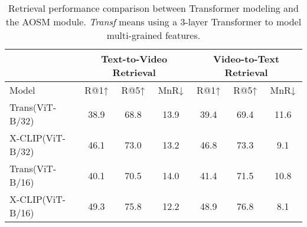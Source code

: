 \documentclass[sigconf]{acmart}
\begin{document}
\begin{table*}[]
\caption{Retrieval performance comparison between Transformer modeling and the AOSM module. \emph{Transf} means using a 3-layer Transformer to model multi-grained features.}
\begin{tabular}{l|ccc|ccc} 
\hline
                    & \multicolumn{3}{c}{Text-to-Video Retrieval} & \multicolumn{3}{c}{Video-to-Text Retrieval}               \\ \hline
Model               & R@1↑          & R@5↑                 & MnR↓          & R@1↑          & R@5↑                   & MnR↓    \\ \hline
Trans(ViT-B/32)     & 38.9         & 68.8        & 13.9           & 39.4                & 69.4                & 11.6          \\
X-CLIP(ViT-B/32) & 46.1         & 73.0        & 13.2           & 46.8                & 73.3                & 9.1           \\ \hline
Trans(ViT-B/16)     & 40.1         & 70.5        & 14.0           & 41.4                & 71.5                & 10.8          \\
X-CLIP(ViT-B/16) & 49.3         & 75.8        & 12.2           & 48.9                & 76.8                & 8.1   \\ \hline       
\end{tabular}
\label{tab:Transf}
\end{table*}
\end{document}
